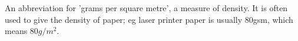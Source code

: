 An abbreviation for 'grams per square metre', a measure of density. It is often
used to give the density of paper; eg laser printer paper is usually 80gsm, which
means $80g/m^{2}.$ 